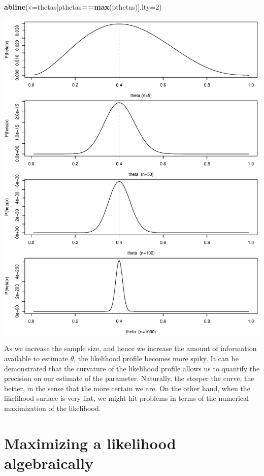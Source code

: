 \documentclass[
]{book}
\newenvironment{Shaded}{\begin{snugshade}}{\end{snugshade}}
\newcommand{\AttributeTok}[1]{\textcolor[rgb]{0.13,0.29,0.53}{#1}}
\newcommand{\DecValTok}[1]{\textcolor[rgb]{0.00,0.00,0.81}{#1}}
\newcommand{\FunctionTok}[1]{\textcolor[rgb]{0.13,0.29,0.53}{\textbf{#1}}}
\newcommand{\NormalTok}[1]{#1}
\newcommand{\SpecialCharTok}[1]{\textcolor[rgb]{0.81,0.36,0.00}{\textbf{#1}}}
\begin{document}
\begin{Shaded}
\begin{Highlighting}[]
\FunctionTok{abline}\NormalTok{(}\AttributeTok{v=}\NormalTok{thetas[pthetas}\SpecialCharTok{==}\FunctionTok{max}\NormalTok{(pthetas)],}\AttributeTok{lty=}\DecValTok{2}\NormalTok{)}
\end{Highlighting}
\end{Shaded}

\includegraphics{ECOMODbook_files/figure-latex/ch13.4-1.pdf}

As we increase the sample size, and hence we increase the amount of information available to estimate \(\theta\), the likelihood profile becomes more spiky. It can be demonstrated that the curvature of the likelihood profile allows us to quantify the precision on our estimate of the parameter. Naturally, the steeper the curve, the better, in the sense that the more certain we are. On the other hand, when the likelihood surface is very flat, we might hit problems in terms of the numerical maximization of the likelihood.

\section{Maximizing a likelihood algebraically}\label{maximizing-a-likelihood-algebraically}
\end{document}
